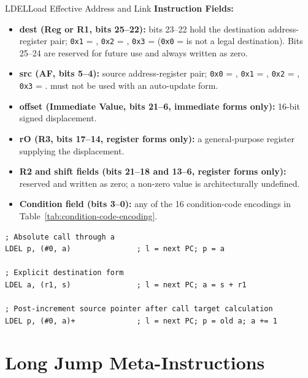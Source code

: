 \begin{instructionbox}{LDEL}{Load Effective Address and Link}
	\textbf{Instruction Fields:}
	\begin{itemize}
		\item \textbf{dest (Reg or R1, bits 25--22):} bits 23--22 hold the destination address-register pair;
		      \texttt{0x1} = , \texttt{0x2} = , \texttt{0x3} =  (\texttt{0x0} =  is not a legal
		       destination). Bits 25--24 are reserved for future use and always written as zero.
		\item \textbf{src (AF, bits 5--4):} source address-register pair; \texttt{0x0} = , \texttt{0x1} =
		      , \texttt{0x2} = , \texttt{0x3} = \reg{p}.  must not be used with an auto-update form.
		\item \textbf{offset (Immediate Value, bits 21--6, immediate forms only):} 16-bit signed displacement.
		\item \textbf{rO (R3, bits 17--14, register forms only):} a general-purpose register supplying the displacement.
		\item \textbf{R2 and shift fields (bits 21--18 and 13--6, register forms only):} reserved and written as zero; a
		      non-zero value is architecturally undefined.
		\item \textbf{Condition field (bits 3--0):} any of the 16 condition-code encodings in
		      Table~\ref{tab:condition-code-encoding}.
	\end{itemize}

	\begin{example}
		\begin{lstlisting}
; Absolute call through a
LDEL p, (#0, a)               ; l = next PC; p = a

; Explicit destination form
LDEL a, (r1, s)               ; l = next PC; a = s + r1

; Post-increment source pointer after call target calculation
LDEL p, (#0, a)+              ; l = next PC; p = old a; a += 1
		\end{lstlisting}
		\caption{Calling Through a Register with LDEL}
	\end{example}
\end{instructionbox}

\section{Long Jump Meta-Instructions}

